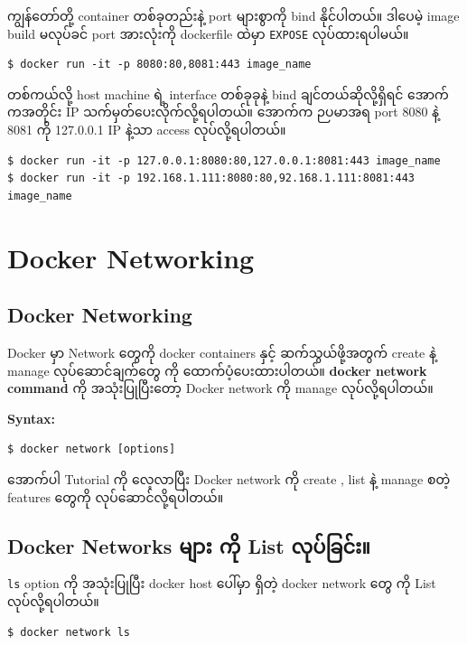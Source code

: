 \documentclass{article}
\begin{document}
ကျွန်တော်တို့ container တစ်ခုတည်းနဲ့ port များစွာကို bind နိုင်ပါတယ်။
ဒါပေမဲ့ image build မလုပ်ခင် port အားလုံးကို dockerfile ထဲမှာ
\texttt{EXPOSE} လုပ်ထားရပါမယ်။

\begin{verbatim}
$ docker run -it -p 8080:80,8081:443 image_name
\end{verbatim}

တစ်ကယ်လို့ host machine ရဲ့ interface တစ်ခုခုနဲ့ bind
ချင်တယ်ဆိုလို့ရှိရင် အောက်ကအတိုင်း IP သက်မှတ်ပေးလိုက်လို့ရပါတယ်။ အောက်က
ဉပမာအရ port 8080 နဲ့ 8081 ကို 127.0.0.1 IP နဲ့သာ access လုပ်လို့ရပါတယ်။

\begin{verbatim}
$ docker run -it -p 127.0.0.1:8080:80,127.0.0.1:8081:443 image_name
$ docker run -it -p 192.168.1.111:8080:80,92.168.1.111:8081:443 image_name
\end{verbatim}

\section{Docker Networking}\label{docker-networking}

\subsection{Docker Networking}\label{docker-networking-1}

Docker မှာ Network တွေကို docker containers နှင့် ဆက်သွယ်ဖို့အတွက်
create နဲ့ manage လုပ်ဆောင်ချက်တွေ ကို ထောက်ပံ့ပေးထားပါတယ်။
\textbf{docker network command} ကို အသုံးပြုပြီးတော့ Docker network ကို
manage လုပ်လို့ရပါတယ်။

\textbf{Syntax:}

\begin{verbatim}
$ docker network [options]
\end{verbatim}

အောက်ပါ Tutorial ကို လေ့လာပြီး Docker network ကို create , list နဲ့
manage စတဲ့ features တွေကို လုပ်ဆောင်လို့ရပါတယ်။

\subsection{Docker Networks များ ကို List
လုပ်ခြင်း။}\label{docker-networks---list-}

\texttt{ls} option ကို အသုံးပြုပြီး docker host ပေါ်မှာ ရှိတဲ့ docker
network တွေ ကို List လုပ်လို့ရပါတယ်။

\begin{verbatim}
$ docker network ls
\end{verbatim}
\end{document}
